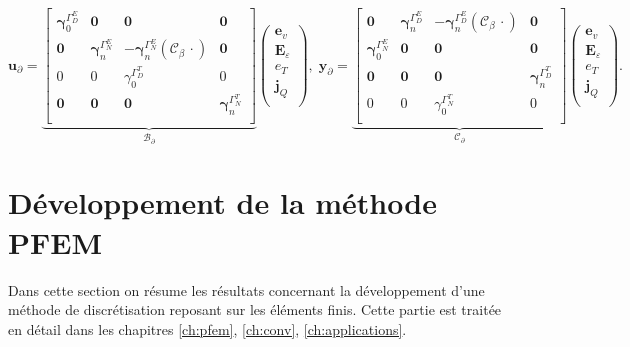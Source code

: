 \begin{equation*}
\bm{u}_\partial = 
\underbrace{\begin{bmatrix}
	\bm{\gamma}_{0}^{\Gamma_D^E} & \bm{0} & \bm{0} & \bm{0} \\
	\bm{0} & \bm{\gamma}_n^{\Gamma_N^E} & - \bm{\gamma}_n^{\Gamma_N^E}(\bm{\mathcal{C}}_\beta\, \cdot )  & \bm{0}  \\ 
	{0} & {0} & {\gamma}_{0}^{\Gamma_D^T} & {0} \\
	\bm{0} & \bm{0} & \bm{0} & \bm{\gamma}_{n}^{\Gamma_N^T} \\
	\end{bmatrix}}_{\mathcal{B}_\partial}
\begin{pmatrix}
\bm{e}_v \\
\bm{E}_\varepsilon \\
{e}_T \\
\bm{j}_Q \\
\end{pmatrix}, \; 
\bm{y}_\partial = 
\underbrace{\begin{bmatrix}
	\bm{0} & \bm{\gamma}_n^{\Gamma_D^E} & - \bm{\gamma}_n^{\Gamma_D^E}(\bm{\mathcal{C}}_\beta\, \cdot )  & \bm{0}  \\ 
	\bm{\gamma}_{0}^{\Gamma_N^E} & \bm{0} & \bm{0} & \bm{0} \\
	\bm{0} & \bm{0} & \bm{0} & \bm{\gamma}_{n}^{\Gamma_D^T} \\
	{0} & {0} & {\gamma}_{0}^{\Gamma_N^T} & {0} \\
	\end{bmatrix}}_{\mathcal{C}_\partial}
\begin{pmatrix}
\bm{e}_v \\
\bm{E}_\varepsilon \\
{e}_T \\
\bm{j}_Q \\
\end{pmatrix}.
\end{equation*} 

\section{Développement de la méthode PFEM}

Dans cette section on résume les résultats concernant la développement d'une méthode de discrétisation reposant sur les éléments finis. Cette partie est traitée en détail dans les chapitres \ref{ch:pfem}, \ref{ch:conv}, \ref{ch:applications}. \\


